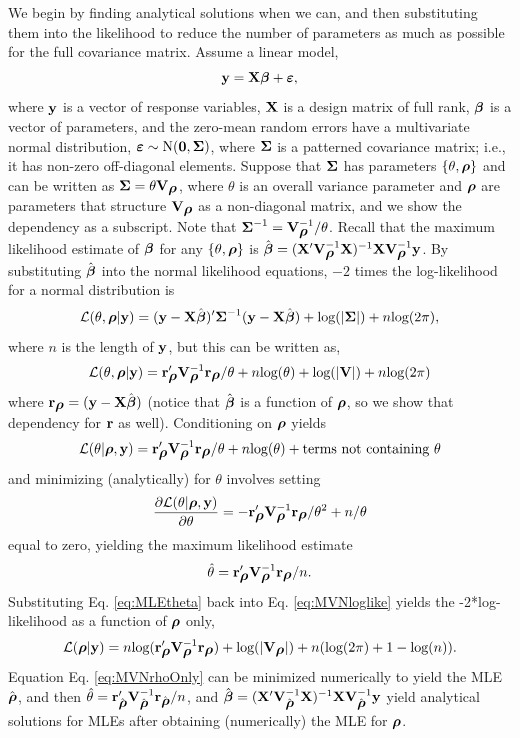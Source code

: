 \documentclass[11pt, titlepage]{article}\usepackage[]{graphicx}\usepackage[]{color}
\begin{document}
\begin{spacing}{1.9}
\begin{flushleft}
We begin by finding analytical solutions when we can, and then substituting them into the likelihood to reduce the number of parameters as much as possible for the full covariance matrix.  Assume a linear model,
\[
  \by = \bX\bbeta + \bvarepsilon,
\]
where $\by$ is a vector of response variables, $\bX$ is a design matrix of full rank, $\bbeta$ is a vector of parameters, and the zero-mean random errors have a multivariate normal distribution, $\bvarepsilon \sim \textrm{N}(\bzero,\bSigma)$, where $\bSigma$ is a patterned covariance matrix; i.e., it has non-zero off-diagonal elements.  Suppose that $\bSigma$ has parameters $\{\theta,\brho\}$ and can be written as $\bSigma = \theta\bV_{\brho}$, where $\theta$ is an overall variance parameter and $\brho$ are parameters that structure $\bV_{\brho}$ as a non-diagonal matrix, and we show the dependency as a subscript. Note that $\bSigma\upi = \bV\upi_{\brho}/\theta$. Recall that the maximum likelihood estimate of $\bbeta$ for any $\{\theta,\brho\}$ is $\hat{\bbeta} = (\bX\upp\bV\upi_{\brho}\bX)\upi\bX\bV\upi_{\brho}\by$. By substituting $\hat{\bbeta}$ into the normal likelihood equations, $-2$ times the log-likelihood for a normal distribution is
\[
  \cL(\theta,\brho|\by) = (\by - \bX\hat{\bbeta})\upp\bSigma\upi(\by - \bX\hat{\bbeta}) + \log(|\bSigma|) + n\log(2\pi),
\]
where $n$ is the length of $\by$, but this can be written as,
\begin{equation}\label{eq:MVNloglike}
\cL(\theta,\brho|\by) = \br_{\brho}\upp\bV\upi_{\brho}\br_{\brho}/\theta + n\log(\theta) + \log(|\bV|) + n\log(2\pi)
\end{equation}
where $\br_{\brho} = (\by - \bX\hat{\bbeta})$ (notice that $\hat{\bbeta}$ is a function of $\brho$, so we show that dependency for $\br$ as well).  Conditioning on $\brho$ yields 
\[
\cL(\theta|\brho,\by) = \br_{\brho}\upp\bV\upi_{\brho}\br_{\brho}/\theta + n\log(\theta)+ \textrm{terms not containing } \theta
\]
and minimizing (analytically) for $\theta$ involves setting
\[
\frac{\partial \cL(\theta|\brho,\by)}{\partial \theta} = -\br\upp_{\brho}\bV\upi_{\brho}\br_{\brho}/\theta^2 + n/\theta
\]
equal to zero, yielding the maximum likelihood estimate
\begin{equation}\label{eq:MLEtheta}
 \hat{\theta} = \br\upp_{\brho}\bV\upi_{\brho}\br_{\brho}/n.
\end{equation}
Substituting Eq. \ref{eq:MLEtheta} back into Eq. \ref{eq:MVNloglike} yields the -2*log-likelihood as a function of $\brho$ only,
\begin{equation}\label{eq:MVNrhoOnly}
\cL(\brho|\by) = n\log(\br\upp_{\brho}\bV\upi_{\brho}\br_{\brho}) + \log(|\bV_{\brho}|) + n(\log(2\pi) + 1 - \log(n)). 
\end{equation}
Equation Eq. \ref{eq:MVNrhoOnly} can be minimized numerically to yield the MLE $\hat{\brho}$, and then $\hat{\theta} = \br\upp_{\hat{\brho}}\bV\upi_{\hat{\brho}}\br_{\hat{\brho}}/n$, and  $\hat{\bbeta} = (\bX\upp\bV\upi_{\hat{\brho}}\bX)\upi\bX\bV\upi_{\hat{\brho}}\by$ yield analytical solutions for MLEs after obtaining (numerically) the MLE for $\brho$.


\end{flushleft}
\end{spacing}
\end{document}
